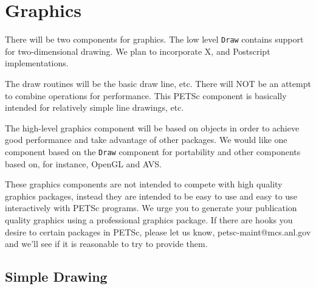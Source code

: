
\chapter{Graphics}
\label{ch:graphics}

There will be two components for graphics. The low level {\tt Draw} 
contains support for two-dimensional drawing.
We plan to incorporate X,  and Postscript implementations. 

The draw routines will be the basic draw line, etc. There will NOT
be an attempt to combine operations for performance. This 
PETSc component is basically 
intended for relatively simple line drawings, etc.

The high-level graphics component will be based on objects in order to
achieve good performance and take advantage of other packages.
We would like one component based on the {\tt Draw} component for 
portability and other components based on, for instance, OpenGL and
AVS.

These graphics components are not intended to compete with 
high quality graphics packages, instead they are intended to be 
easy to use and easy to use interactively with PETSc programs. We urge 
you to generate your publication quality graphics using a
professional graphics package. If there are hooks you desire to 
certain packages in PETSc, please let us know, petsc-maint@mcs.anl.gov
and we'll see if it is reasonable to try to provide them.

\section{Simple Drawing}

